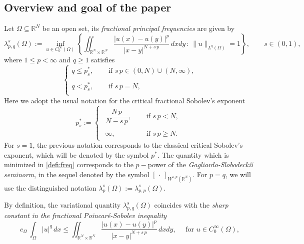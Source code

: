 \documentclass{amsart}
\theoremstyle{definition}
\numberwithin{equation}{section}
\begin{document}
	\subsection{Overview and goal of the paper}
	Let $\Omega \subseteq \mathbb{R}^N$ be an open set, its {\it fractional principal frequencies} are given by
	\begin{equation} \label{defi:freq}
		\lambda^{s}_{p, q}(\Omega) := \displaystyle \inf_{u \in C^{\infty}_0(\Omega)} \left\{\iint_{\mathbb{R}^N \times \mathbb{R}^N} \frac{|u(x) - u(y)|^p}{|x-y|^{N+s\,p}}\,dxdy \,:\, \|u\|_{L^q(\Omega)} = 1 \right\}, \qquad s\in(0,1),
	\end{equation}
	where $1 \le p < \infty$ and $q \ge 1$ satisfies 
	\begin{equation} \label{hp:subcritical}
		\begin{cases}
			q \le p^*_s, \quad &\mbox{ if } s\,p \in (0, N) \cup (N, \infty),\\
			\\
			q < p^*_s, \quad &\mbox{ if } s\,p=N, \\
		\end{cases}
	\end{equation}
	Here we adopt the usual notation for the critical fractional Sobolev's exponent 
	\[
	p^*_s := \begin{cases}
		\begin{aligned}
			\dfrac{N\,p}{N-s\,p}, \quad &\mbox{ if } s\,p < N,\\
			\\
			\infty, \quad &\mbox{ if } s\,p \ge N.
		\end{aligned}
	\end{cases}
	\]
	For $s=1$, the previous notation corresponds to the classical critical Sobolev's exponent, which will be denoted by the symbol $p^*$. 
	The quantity which is minimized in \eqref{defi:freq} corresponds to the $p-$power of the {\it Gagliardo-Slobodecki\u{\i} seminorm}, in the sequel denoted by the symbol $[\,\cdot\,]_{W^{s,p}(\mathbb{R}^N)}$. For $p = q$, we will use the distinguished notation $\lambda_{p}^s(\Omega) := \lambda_{p, p}^s(\Omega)$.     
	\par
	By definition, the variational quantity $\lambda_{p, q}^s(\Omega)$ coincides with the {\it sharp constant in the fractional Poincar\'e-Sobolev inequality}
	\begin{equation} \label{intro:poin-sob}
		c_\Omega\,\int_\Omega |u|^q\,dx \le \iint_{\mathbb{R}^N \times \mathbb{R}^N} \frac{|u(x) - u(y)|^p}{|x-y|^{N+s\,p}}\,dxdy, \quad \mbox{ for } u \in C^\infty_0(\Omega),
	\end{equation}
\end{document}
